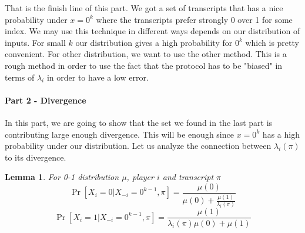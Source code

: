\documentclass{article}
\theoremstyle{plain}
\newtheorem{lemma}[theorem]{Lemma}
\begin{document}
That is the finish line of this part. We got a set of transcripts that has a nice probability under $x = 0^k$ where the transcripts prefer strongly 0 over 1 for some index. We may use this technique in different ways depends on our distribution of inputs. For small $k$ our distribution gives a high probability for $0^k$ which is pretty convenient. For other distribution, we want to use the other method. \newline
This is a rough method in order to use the fact that the protocol has to be "biased" in terms of $\lambda_i$ in order to have a low error. \newline
\paragraph{Part 2 - Divergence}
In this part, we are going to show that the set we found in the last part is contributing large enough divergence. This will be enough since $x = 0^k$ has a high probability under our distribution. \newline
Let us analyze the connection between $\lambda_i(\pi)$ to its divergence. \newline
\begin{lemma}
    For 0-1 distribution $\mu$, player $i$ and transcript $\pi$
    \begin{equation*}
        \Pr[X_i = 0 | X_{-i}=0^{k-1}, \pi] = \frac{\mu(0)}{\mu(0) + \frac{\mu(1)}{\lambda_i(\pi)}}
    \end{equation*}
    \begin{equation*}
        \Pr[X_i = 1 | X_{-i}=0^{k-1}, \pi] = \frac{\mu(1)}{\lambda_i(\pi)\mu(0) + \mu(1)}
    \end{equation*}
\end{lemma}
\end{document}
